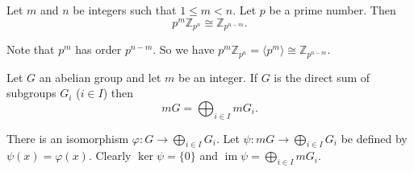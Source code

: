 \begin{lemma} \label{lemma-FGAG-small-1}
	Let $m$ and $n$ be integers such that $1\leq m<n$. Let $p$ be a prime number. Then $$p^m\mathbb{Z}_{p^n}\cong \mathbb{Z}_{p^{n-m}}.$$
\end{lemma}
\begin{sketch}
	Note that $p^m$ has order $p^{n-m}$. So we have $p^m \mathbb{Z}_{p^n} = \langle p^m \rangle  \cong \mathbb{Z}_{p^{n-m}}$.
\end{sketch}
\begin{lemma} \label{lemma-FGAG-small-2}
	Let $G$ an abelian group and let $m$ be an integer. If $G$ is the direct sum of  subgroups $G_i$ ($i\in I$) then
	\begin{equation*}
		mG = \bigoplus_{i\in I}mG_i.
	\end{equation*}
\end{lemma}
\begin{sketch}
	There is an isomorphism $\varphi: G\rightarrow \bigoplus_{i\in I}G_i$. Let $\psi:mG \rightarrow \bigoplus_{i\in I}G_i$ be defined by $\psi(x) = \varphi(x)$. Clearly $\ker \psi = \{0\}$ and $\operatorname{im} \psi = \bigoplus_{i\in I}mG_i$.
\end{sketch}

